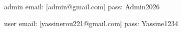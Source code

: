 admin
email: [admin@gmail.com]
pass: Admin2026

user
email: [yassinerou221@gmail.com]
pass: Yassine1234


